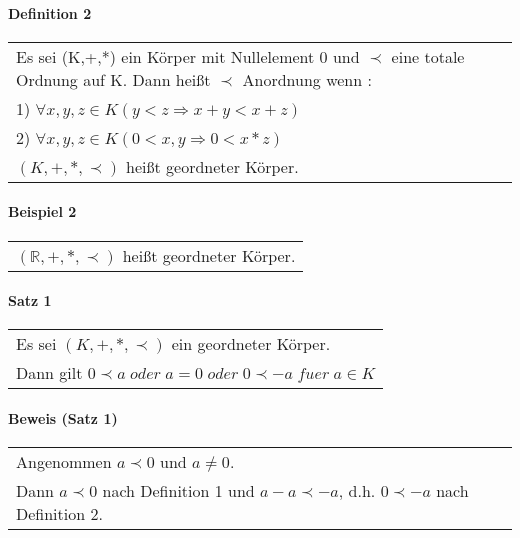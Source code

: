 \documentclass[a4paper]{scrartcl}
\begin{document}
\paragraph{Definition 2}
\begin{tabbing}
\begin{tabular}{l}
Es sei (K,+,*) ein Körper mit Nullelement 0 und $ \prec $ eine totale Ordnung auf K. Dann heißt $ \prec $ Anordnung wenn : \\
1) $ \forall x,y,z \in K (y<z \Rightarrow x+y < x+z) $ \\
2) $ \forall x,y,z \in K (0<x,y \Rightarrow 0<x*z) $\\
$ (K,+,*,\prec) $ heißt geordneter Körper.
\end{tabular}
\end{tabbing}

\paragraph{Beispiel 2}
\begin{tabbing}
\begin{tabular}{l}
$( \mathbb{R} ,+,*, \prec ) $ heißt geordneter Körper.
\end{tabular}
\end{tabbing}

\paragraph{Satz 1}
\begin{tabbing}
\begin{tabular}{l}
Es sei $ (K,+,*,\prec) $ ein geordneter Körper.\\
Dann gilt $ 0\prec a \; oder \; a=0 \; oder \; 0\prec -a \; fuer \; a \in K $
\end{tabular}
\end{tabbing}

\paragraph{Beweis (Satz 1)}
\begin{tabbing}
\begin{tabular}{l}
Angenommen $ a \prec 0 $ und $ a \neq 0 $.\\
Dann $ a \prec 0  $ nach Definition 1 und $ a-a \prec -a $, d.h.
$ 0 \prec -a $ nach Definition 2.
\end{tabular}
\end{tabbing}
\end{document}
